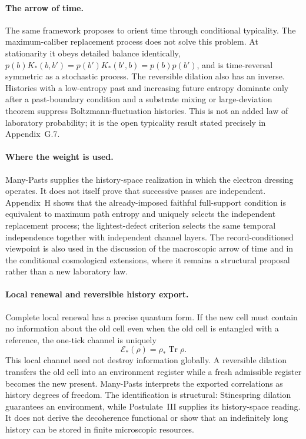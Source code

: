 \documentclass[11pt]{article}
\begin{document}
\paragraph{The arrow of time.}
The same framework proposes to orient time through conditional typicality. The maximum-caliber replacement process does not solve this problem. At stationarity it obeys detailed balance identically, $p(b)K_*(b,b')=p(b')K_*(b',b)=p(b)p(b')$, and is time-reversal symmetric as a stochastic process. The reversible dilation also has an inverse. Histories with a low-entropy past and increasing future entropy dominate only after a past-boundary condition and a substrate mixing or large-deviation theorem suppress Boltzmann-fluctuation histories. This is not an added law of laboratory probability; it is the open typicality result stated precisely in Appendix~G.7.

\paragraph{Where the weight is used.}
Many-Pasts supplies the history-space realization in which the electron dressing operates. It does not itself prove that successive passes are independent. Appendix~H shows that the already-imposed faithful full-support condition is equivalent to maximum path entropy and uniquely selects the independent replacement process; the lightest-defect criterion selects the same temporal independence together with independent channel layers. The record-conditioned viewpoint is also used in the discussion of the macroscopic arrow of time and in the conditional cosmological extensions, where it remains a structural proposal rather than a new laboratory law.

\paragraph{Local renewal and reversible history export.}
Complete local renewal has a precise quantum form. If the new cell must contain no information about the old cell even when the old cell is entangled with a reference, the one-tick channel is uniquely
\[
\mathcal E_*(\rho)=\rho_*\operatorname{Tr}\rho .
\]
This local channel need not destroy information globally. A reversible dilation transfers the old cell into an environment register while a fresh admissible register becomes the new present. Many-Pasts interprets the exported correlations as history degrees of freedom. The identification is structural: Stinespring dilation guarantees an environment, while Postulate~III supplies its history-space reading. It does not derive the decoherence functional or show that an indefinitely long history can be stored in finite microscopic resources.
\end{document}
